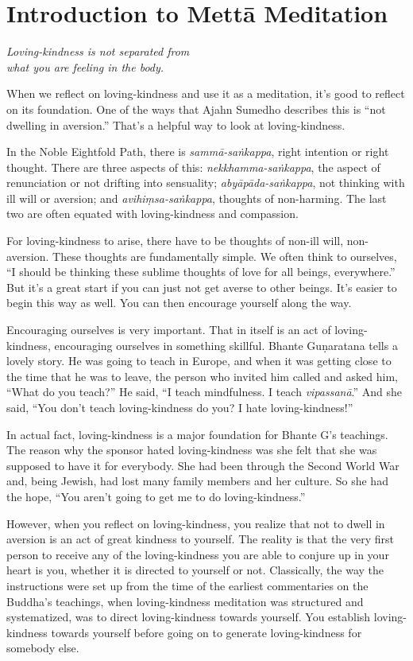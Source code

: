 \chapter{Introduction to Mettā
Meditation}

\epigraph{\emph{Loving-kindness is not separated from\\what you are
feeling in the body.}}{}

When we reflect on loving-kindness and use it as a meditation, it’s good
to reflect on its foundation. One of the ways that Ajahn Sumedho
describes this is “not dwelling in aversion.” That’s a helpful way to
look at loving-kindness.

In the Noble Eightfold Path, there is \emph{sammā-saṅkappa}, right
intention or right thought. There are three aspects of this:
\emph{nekkhamma-saṅkappa}, the aspect of renunciation or not drifting
into sensuality; \emph{abyāpāda-saṅkappa}, not thinking with ill will or
aversion; and \emph{avihiṃsa-saṅkappa}, thoughts of non-harming. The
last two are often equated with loving-kindness and compassion.

For loving-kindness to arise, there have to be thoughts of non-ill will,
non-aversion. These thoughts are fundamentally simple. We often think to
ourselves, “I should be thinking these sublime thoughts of love for all
beings, everywhere.” But it’s a great start if you can just not get
averse to other beings. It’s easier to begin this way as well. You can
then encourage yourself along the way.

Encouraging ourselves is very important. That in itself is an act of
loving-kindness, encouraging ourselves in something skillful. Bhante
Guṇaratana tells a lovely story. He was going to teach in Europe, and
when it was getting close to the time that he was to leave, the person
who invited him called and asked him, “What do you teach?” He said, “I
teach mindfulness. I teach \emph{vipassanā}.” And she said, “You don’t
teach loving-kindness do you? I hate loving-kindness!”

In actual fact, loving-kindness is a major foundation for Bhante G’s
teachings. The reason why the sponsor hated loving-kindness was she felt
that she was supposed to have it for everybody. She had been through the
Second World War and, being Jewish, had lost many family members and her
culture. So she had the hope, “You aren’t going to get me to do
loving-kindness.”

However, when you reflect on loving-kindness, you realize that not to
dwell in aversion is an act of great kindness to yourself. The reality
is that the very first person to receive any of the loving-kindness you
are able to conjure up in your heart is you, whether it is directed to
yourself or not. Classically, the way the instructions were set up from
the time of the earliest commentaries on the Buddha’s teachings, when
loving-kindness meditation was structured and systematized, was to
direct loving-kindness towards yourself. You establish loving-kindness
towards yourself before going on to generate loving-kindness for
somebody else.

